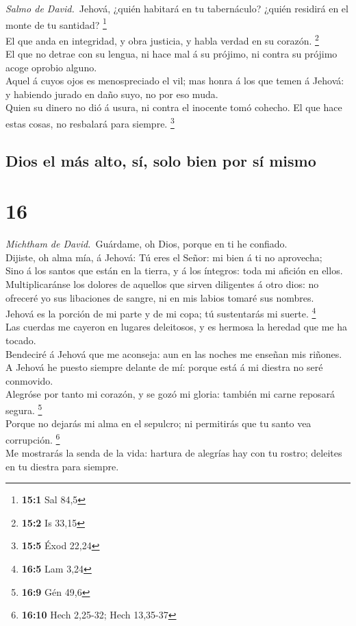  \emph{Salmo de David.}~Jehová, ¿quién habitará en tu
tabernáculo? ¿quién residirá en el monte de tu santidad? \footnote{\textbf{15:1}
  Sal 84,5}\\
 El que anda en integridad, y obra justicia, y habla verdad
en su corazón. \footnote{\textbf{15:2} Is 33,15}\\
 El que no detrae con su lengua, ni hace mal á su prójimo,
ni contra su prójimo acoge oprobio alguno.\\
 Aquel á cuyos ojos es menospreciado el vil; mas honra á los
que temen á Jehová: y habiendo jurado en daño suyo, no por eso muda.\\
 Quien su dinero no dió á usura, ni contra el inocente tomó
cohecho. El que hace estas cosas, no resbalará para siempre. \footnote{\textbf{15:5}
  Éxod 22,24}

\hypertarget{dios-el-muxe1s-alto-suxed-solo-bien-por-suxed-mismo}{%
\subsection{Dios el más alto, sí, solo bien por sí
mismo}\label{dios-el-muxe1s-alto-suxed-solo-bien-por-suxed-mismo}}

\hypertarget{section-15}{%
\section{16}\label{section-15}}

 \emph{Michtham de David.}~Guárdame, oh Dios, porque en ti
he confiado.\\
 Dijiste, oh alma mía, á Jehová: Tú eres el Señor: mi bien á
ti no aprovecha;\\
 Sino á los santos que están en la tierra, y á los íntegros:
toda mi afición en ellos.\\
 Multiplicaránse los dolores de aquellos que sirven
diligentes á otro dios: no ofreceré yo sus libaciones de sangre, ni en
mis labios tomaré sus nombres.\\
 Jehová es la porción de mi parte y de mi copa; tú
sustentarás mi suerte. \footnote{\textbf{16:5} Lam 3,24}\\
 Las cuerdas me cayeron en lugares deleitosos, y es hermosa
la heredad que me ha tocado.\\
 Bendeciré á Jehová que me aconseja: aun en las noches me
enseñan mis riñones.\\
 A Jehová he puesto siempre delante de mí: porque está á mi
diestra no seré conmovido.\\
 Alegróse por tanto mi corazón, y se gozó mi gloria: también
mi carne reposará segura. \footnote{\textbf{16:9} Gén 49,6}\\
 Porque no dejarás mi alma en el sepulcro; ni permitirás
que tu santo vea corrupción. \footnote{\textbf{16:10} Hech 2,25-32; Hech
  13,35-37}\\
 Me mostrarás la senda de la vida: hartura de alegrías hay
con tu rostro; deleites en tu diestra para siempre.


